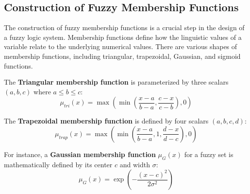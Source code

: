 \documentclass[openany]{book}
\begin{document}
\subsection{Construction of Fuzzy Membership Functions}
\label{subsec:fuzzy_membership}
The construction of fuzzy membership functions is a crucial step in the design of a fuzzy logic system. Membership functions define how the linguistic values of a variable relate to the underlying numerical values. There are various shapes of membership functions, including triangular, trapezoidal, Gaussian, and sigmoid functions. 

The \textbf{Triangular membership function} is parameterized by three scalars $(a, b, c)$ where $a \le b \le c$:
\begin{equation}
    \mu_{tri}(x) = \max\left( \min\left( \frac{x-a}{b-a}, \frac{c-x}{c-b} \right), 0 \right)
\end{equation}

The \textbf{Trapezoidal membership function} is defined by four scalars $(a, b, c, d)$:
\begin{equation}
    \mu_{trap}(x) = \max\left( \min\left( \frac{x-a}{b-a}, 1, \frac{d-x}{d-c} \right), 0 \right)
\end{equation}

For instance, a \textbf{Gaussian membership function} $\mu_G(x)$ for a fuzzy set is mathematically defined by its center $c$ and width $\sigma$:
\begin{equation}
    \mu_G(x) = \exp\left( -\frac{(x - c)^2}{2\sigma^2} \right)
\end{equation}
\end{document}
